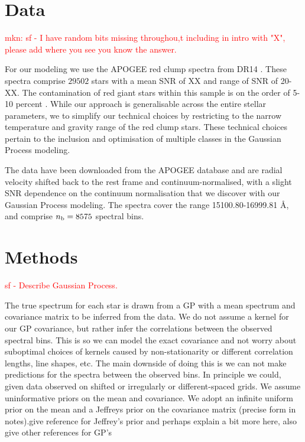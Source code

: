 \documentclass[a4paper,fleqn,usenatbib]{mnras}
\newcommand{\nb}{n_{\rm b}}
\begin{document}
\section{Data} 

\textcolor{red}{mkn: sf  - I have random bits missing throughou,t including in intro with "X", please add where you see you know the answer.}

For our modeling we use the APOGEE red clump spectra from DR14 \citep{Majewski2017, Bovy2015}. These spectra comprise $29502$ stars with a mean SNR of XX and range of SNR of 20-XX.  The contamination of red giant stars within this sample is on the order of 5-10 percent \citep{Bovy2015}. While our approach is generalisable across the entire stellar parameters, we to simplify our technical choices by restricting to the narrow temperature and gravity range of the red clump stars. These technical choices pertain to the inclusion and optimisation of multiple classes in the Gaussian Process modeling.


The data have been downloaded from the APOGEE database and are radial velocity shifted back to the rest frame and continuum-normalised, with a slight SNR dependence on the continuum normalisation that we discover with our Gaussian Process modeling. The spectra cover the range 15100.80-16999.81 \AA, and comprise $\nb = 8575$ spectral bins. 

\section{Methods}

\textcolor{red}{sf - Describe Gaussian Process. }

The true spectrum for each star is drawn from a GP with a mean spectrum and covariance matrix to be inferred from the data. We do not assume a kernel for our GP covariance, but rather infer the correlations between the observed spectral bins. This is so we can model the exact covariance and not worry about suboptimal choices of kernels caused by non-stationarity or different correlation lengths, line shapes, etc. The main downside of doing this is we can not make predictions for the spectra between the observed bins. In principle we could, given data observed on shifted or irregularly or different-spaced grids. We assume uninformative priors on the mean and covariance. We adopt an infinite uniform prior on the mean and a Jeffreys prior on the covariance matrix (precise form in notes).\textcolor{mkn}{give reference for Jeffrey's prior and perhaps explain a bit more here, also give other references for GP's}
\end{document}
